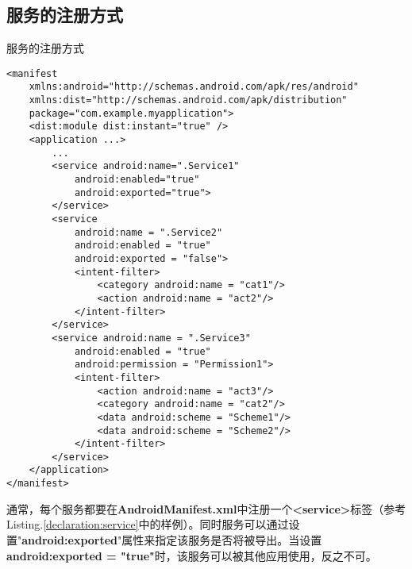 \subsection{服务的注册方式}
\begin{listing}[htbp]
	\centering
	\caption{服务的注册方式}
	\begin{verbatim}
<manifest
    xmlns:android="http://schemas.android.com/apk/res/android"
    xmlns:dist="http://schemas.android.com/apk/distribution"
    package="com.example.myapplication">
    <dist:module dist:instant="true" />
    <application ...>
        ...
        <service android:name=".Service1"
            android:enabled="true"
            android:exported="true">
        </service>
        <service
            android:name = ".Service2"
            android:enabled = "true"
            android:exported = "false">
            <intent-filter>
                <category android:name = "cat1"/>
                <action android:name = "act2"/>
            </intent-filter>
        </service>
        <service android:name = ".Service3"
            android:enabled = "true"
            android:permission = "Permission1">
            <intent-filter>
                <action android:name = "act3"/>
                <category android:name = "cat2"/>
                <data android:scheme = "Scheme1"/>
                <data android:scheme = "Scheme2"/>
            </intent-filter>
        </service>
    </application>
</manifest>
	\end{verbatim}
	\label{declaration:service}
\end{listing}
通常，每个服务都要在\textbf{AndroidManifest.xml}中注册一个\textbf{<service>}标签（参考Listing.\textcolor{red}{\ref{declaration:service}}中的样例）。同时服务可以通过设置"\textbf{android:exported}"属性来指定该服务是否将被导出。当设置\textbf{android:exported = "true"}时，该服务可以被其他应用使用，反之不可。
